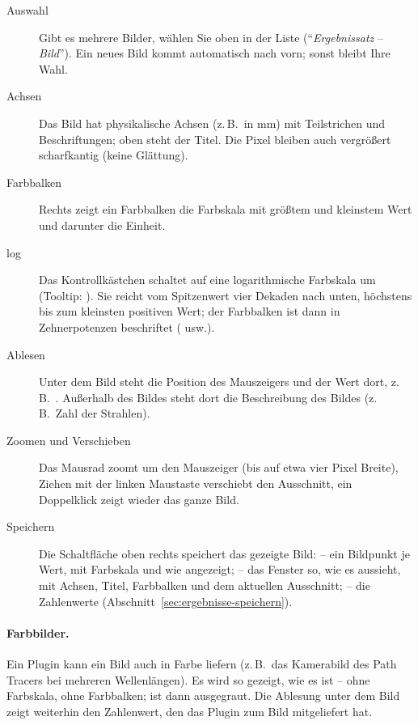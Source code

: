 \begin{description}
  \item[Auswahl] Gibt es mehrere Bilder, wählen Sie oben in der Liste
        (\enquote{\textit{Ergebnissatz} – \textit{Bild}}). Ein neues Bild kommt automatisch
        nach vorn; sonst bleibt Ihre Wahl.
  \item[Achsen] Das Bild hat physikalische Achsen (z.\,B.\ in mm) mit Teilstrichen und
        Beschriftungen; oben steht der Titel. Die Pixel bleiben auch vergrößert scharfkantig
        (keine Glättung).
  \item[Farbbalken] Rechts zeigt ein Farbbalken die Farbskala mit größtem und kleinstem Wert
        und darunter die Einheit.
  \item[log] Das Kontrollkästchen  schaltet auf eine logarithmische Farbskala um
        (Tooltip: ). Sie
        reicht vom Spitzenwert vier Dekaden nach unten, höchstens bis zum kleinsten positiven
        Wert; der Farbbalken ist dann in Zehnerpotenzen beschriftet ( usw.).
  \item[Ablesen] Unter dem Bild steht die Position des Mauszeigers und der Wert dort,
        z.\,B.\ . Außerhalb des Bildes steht dort
        die Beschreibung des Bildes (z.\,B.\ Zahl der Strahlen).
  \item[Zoomen und Verschieben] Das Mausrad zoomt um den Mauszeiger (bis auf etwa vier Pixel
        Breite), Ziehen mit der linken Maustaste verschiebt den Ausschnitt, ein Doppelklick
        zeigt wieder das ganze Bild.
  \item[Speichern] Die Schaltfläche  oben rechts speichert das gezeigte Bild:
         -- ein Bildpunkt je Wert, mit Farbskala und  wie
        angezeigt;  -- das Fenster so, wie es aussieht, mit Achsen,
        Titel, Farbbalken und dem aktuellen Ausschnitt;  -- die Zahlenwerte
        (Abschnitt~\ref{sec:ergebnisse-speichern}).
\end{description}

\paragraph{Farbbilder.} Ein Plugin kann ein Bild auch in Farbe liefern (z.\,B.\ das
Kamerabild des Path Tracers bei mehreren Wellenlängen). Es wird so gezeigt, wie es ist – ohne
Farbskala, ohne Farbbalken;  ist dann ausgegraut. Die Ablesung unter dem Bild zeigt
weiterhin den Zahlenwert, den das Plugin zum Bild mitgeliefert hat.

